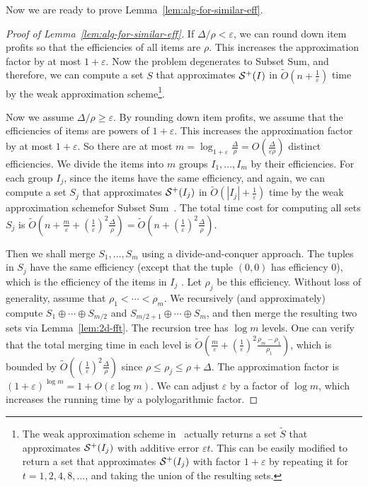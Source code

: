\documentclass[a4paper,UKenglish,cleveref, autoref, thm-restate, pdfa]{lipics-v2021}
\newcommand{\eps}{\varepsilon}
\renewcommand{\leq}{\leqslant}
\renewcommand{\geq}{\geqslant}
\begin{document}
Now we are ready to prove Lemma~\ref{lem:alg-for-similar-eff}. \begin{proof}[Proof of Lemma~\ref{lem:alg-for-similar-eff}]
If $\Delta/\rho< \eps$, we can round down item profits so that the efficiencies of all items are $\rho$. This increases the approximation factor by at most $1 + \eps$. Now the problem degenerates to Subset Sum, and therefore, we can compute a set $S$ that approximates ${\cal S}^+(I)$ in $\tilde{O}(n + \frac{1}{\eps})$ time by the weak approximation scheme\footnote{The weak approximation scheme in~\cite{CLMZ24cSTOCPartition} actually returns a set $\tilde{S}$ that approximates ${\cal S}^+(I_j)$ with additive error $\eps t$. This can be easily modified to return a set that approximates ${\cal S}^+(I_j)$ with factor $1+\eps$ by repeating it for $t = 1,2,4,8,\ldots$, and taking the union of the resulting sets.}.

Now we assume $\Delta/\rho\geq\eps$. By rounding down item profits, we assume that the efficiencies of items are powers of $1 + \eps$. This increases the approximation factor by at most $1 + \eps$. So there are at most $m = \log_{1+ \eps} \frac{\Delta}{\rho} = O(\frac{\Delta}{\eps\rho})$ distinct efficiencies.  We divide the items into $m$ groups $I_1, \ldots, I_m$ by their efficiencies.  For each group $I_j$, since the items have the same efficiency, and again, we can compute a set $S_j$ that approximates ${\cal S}^+(I_j)$ in $\tilde{O}(|I_j| + \frac{1}{\eps})$ time by the weak approximation schemefor Subset Sum~\cite{CLMZ24cSTOCPartition}. The total time cost for computing all sets $S_j$ is $\tilde{O}(n + \frac{m}{\eps} + (\frac{1}{\eps})^2 \frac{\Delta}{\rho})=\tilde{O}(n + (\frac{1}{\eps})^2 \frac{\Delta}{\rho})$.

    Then we shall merge $S_1, \ldots, S_m$ using a divide-and-conquer approach. The tuples in $S_j$ have the same efficiency (except that the tuple $(0,0)$ has efficiency $0$), which is the efficiency of the items in $I_j$ . Let $\rho_j$ be this efficiency. Without loss of generality, assume that $\rho_1 < \cdots < \rho_m$. We recursively (and approximately) compute $S_1 \oplus \cdots \oplus S_{m/2}$ and $S_{m/2 + 1} \oplus \cdots \oplus S_m$, and then merge the resulting two sets via Lemma~\ref{lem:2d-fft}. The recursion tree has $\log m$ levels. One can verify that the total merging time in each level is $\tilde{O}(\frac{m}{\eps} + (\frac{1}{\eps})^2 \frac{\rho_m - \rho_1}{\rho_1})$, which is bounded by $\tilde{O}((\frac{1}{\eps})^2 \frac{\Delta}{\rho})$ since $\rho \leq \rho_j \leq \rho + \Delta$. The approximation factor is $(1 + \eps)^{\log m} = 1 + O(\eps \log m)$. We can adjust $\eps$ by a factor of $\log m$, which increases the running time by a polylogarithmic factor.
\end{proof}
\end{document}
